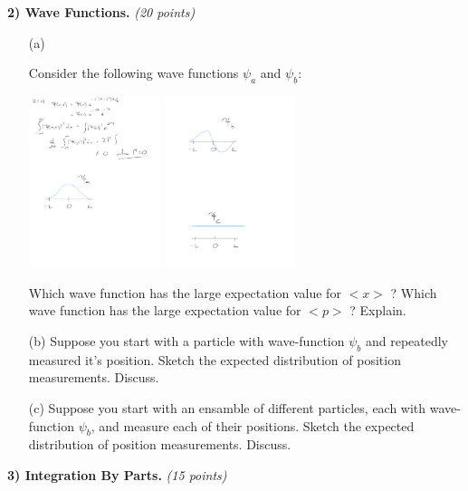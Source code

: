 {\large

\textbf{2) Wave Functions. }\hfill \textit{(20 points)}
\begin{itemize}
\item[(a)]{
Consider the following wave functions $\psi_a$ and $\psi_b$:

\begin{center}
\includegraphics[width=0.3\textwidth]{./psia.pdf}
\hspace{0.3in}
\includegraphics[width=0.3\textwidth]{./psib.pdf}
\end{center}


Which wave function has the large expectation value for $<x>$ ?
Which wave function has the large expectation value for $<p>$ ?
Explain.
}
\item[(b)]{
Suppose you start with a particle with wave-function $\psi_b$ and repeatedly measured it's position.
Sketch the expected distribution of position measurements. 
Discuss.
}
\item[(c)]{
Suppose you start with an ensamble of different particles, each with wave-function $\psi_b$, and measure each of their positions.
Sketch the expected distribution of position measurements. 
Discuss.
}
\end{itemize}

\vspace*{0.4in}

\textbf{3) Integration By Parts. } \hfill \textit{(15 points)}\\

}
